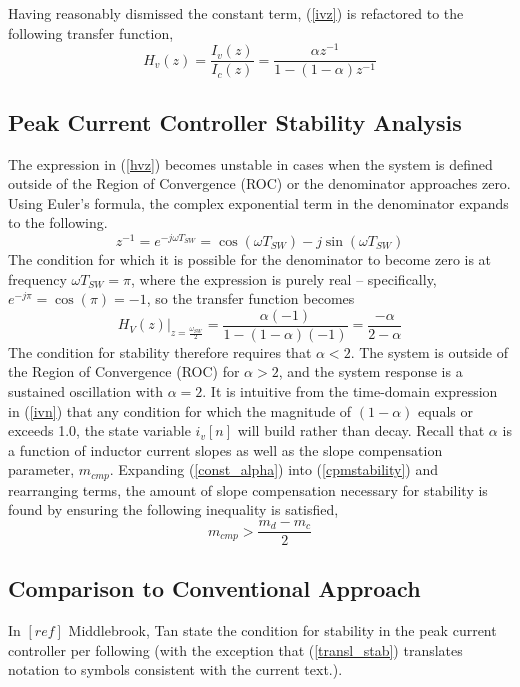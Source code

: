 \documentclass[conference]{IEEEtran}
\begin{document}
Having reasonably dismissed the constant term, (\ref{ivz}) is refactored to the following transfer function,
\begin{equation}
H_v(z) = \frac {I_v(z)} {I_c(z)} = \frac {\alpha z^{-1}} {1 - (1-\alpha) z^{-1}}  \label{hvz}
\end{equation}


\subsection{Peak Current Controller Stability Analysis}

The expression in (\ref{hvz}) becomes unstable in cases when the system is defined outside of the Region of Convergence (ROC) or the denominator approaches zero. Using Euler's formula, the complex exponential term in the denominator expands to the following.
\begin{equation}
	z^{-1} = e^{-j \omega T_{SW}} = \cos (\omega T_{SW}) - j \sin (\omega T_{SW}) 
\end{equation} 
The condition for which it is possible for the denominator to become zero is at frequency $\omega T_{SW} = \pi$, where the expression is purely real -- specifically, $e^{-j \pi} = \cos ( \pi) = -1$, so the transfer function becomes
\begin{equation}
H_V(z) \bigg|_{z=\frac{\omega_{SW}}{2}} = \dfrac{\alpha (-1)}{1 - (1 - \alpha) (-1)} = \dfrac{- \alpha}{2 - \alpha} \label{cpmstability}
\end{equation}
The condition for stability therefore requires that $\alpha < 2$.  The system is outside of the Region of Convergence (ROC) for $\alpha > 2$, and the system response is a sustained oscillation with $\alpha = 2$. It is intuitive from the time-domain expression in (\ref{ivn}) that any condition for which the magnitude of $(1 - \alpha)$ equals or exceeds 1.0, the state variable $i_v[n]$ will build rather than decay.
Recall that $\alpha$ is a function of inductor current slopes as well as the slope compensation parameter, $m_{cmp}$.  Expanding (\ref{const_alpha}) into (\ref{cpmstability}) and rearranging terms, the amount of slope compensation necessary for stability is found by ensuring the following inequality is satisfied,
\begin{equation}
m_{cmp} > \dfrac{m_d - m_c}{2} \label{slope_stab}
\end{equation}

\subsection{Comparison to Conventional Approach}
In $[ref]$ Middlebrook, Tan state the condition for stability in the peak current controller per following (with the exception that (\ref{transl_stab}) translates notation to symbols consistent with the current text.).
\end{document}
